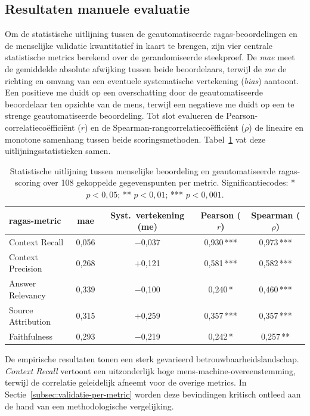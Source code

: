 \subsection{Resultaten manuele evaluatie}
\label{subsec:resultaten-samenvatting}

Om de statistische uitlijning tussen de geautomatiseerde \gls{ragas}-beoordelingen en de menselijke validatie kwantitatief in kaart te brengen, zijn vier centrale statistische metrics berekend over de gerandomiseerde steekproef. De \textit{\gls{mae}} meet de gemiddelde absolute afwijking tussen beide beoordelaars, terwijl de \textit{\gls{me}} de richting en omvang van een eventuele systematische vertekening (\textit{bias}) aantoont. Een positieve \gls{me} duidt op een overschatting door de geautomatiseerde beoordelaar ten opzichte van de mens, terwijl een negatieve \gls{me} duidt op een te strenge geautomatiseerde beoordeling. Tot slot evalueren de Pearson-correlatiecoëfficiënt ($r$) en de Spearman-rangcorrelatiecoëfficiënt ($\rho$) de lineaire en monotone samenhang tussen beide scoringsmethoden. Tabel~\ref{tab:validatie-statistieken} vat deze uitlijningsstatistieken samen.

\begin{table}[h]
\centering
\small
\begin{tabular}{lcccc}
\toprule
\textbf{\gls{ragas}-metric} & \textbf{\gls{mae}} & \textbf{Syst.\ vertekening (\gls{me})} & \textbf{Pearson ($r$)} & \textbf{Spearman ($\rho$)} \\
\midrule
Context Recall       & 0,056 & $-$0,037 & 0,930\,*** & 0,973\,*** \\
Context Precision    & 0,268 & $+$0,121 & 0,581\,*** & 0,582\,*** \\
Answer Relevancy     & 0,339 & $-$0,100 & 0,240\,*   & 0,460\,*** \\
Source Attribution   & 0,315 & $+$0,259 & 0,357\,*** & 0,357\,*** \\
Faithfulness         & 0,293 & $-$0,219 & 0,242\,*   & 0,257\,**  \\
\bottomrule
\end{tabular}
\caption[Methodologische validatie: uitlijningsstatistieken mens--\gls{ragas}]{Statistische uitlijning tussen menselijke beoordeling en geautomatiseerde \gls{ragas}-scoring over 108 gekoppelde gegevenspunten per metric. Significantiecodes: * $p < 0{,}05$; ** $p < 0{,}01$; *** $p < 0{,}001$.}
\label{tab:validatie-statistieken}
\end{table}

De empirische resultaten tonen een sterk gevarieerd betrouwbaarheidslandschap. \textit{Context Recall} vertoont een uitzonderlijk hoge mens-machine-overeenstemming, terwijl de correlatie geleidelijk afneemt voor de overige metrics. In Sectie~\ref{subsec:validatie-per-metric} worden deze bevindingen kritisch ontleed aan de hand van een methodologische vergelijking.

